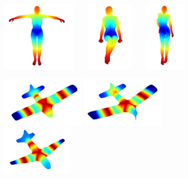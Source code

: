 \begin{figure}[t!] 
\begin{center}
\includegraphics[height = 3.5cm]{figures/stab13}\ \ \ \ \includegraphics[height = 3.5cm]{figures/stab14}\ \ \ \ \includegraphics[height = 3.5cm]{figures/stab15}

\includegraphics[height = 2.5cm]{figures/stab7}
\includegraphics[height = 2.5cm]{figures/stab8}
\includegraphics[height = 2.5cm]{figures/stab9}


\end{center}
\end{figure}

